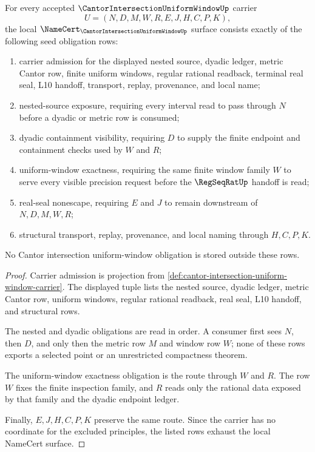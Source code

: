 \begin{theorem}
\label{thm:cantor-intersection-uniform-window-namecert-obligations}
For every accepted $\CantorIntersectionUniformWindowUp$ carrier
$$
U=(N,D,M,W,R,E,J,H,C,P,K),
$$
the local $\NameCert_{\CantorIntersectionUniformWindowUp}$ surface consists exactly of the following seed obligation rows:
\begin{enumerate}
\item carrier admission for the displayed nested source, dyadic ledger, metric Cantor row, finite uniform windows, regular rational readback, terminal real seal, L10 handoff, transport, replay, provenance, and local name;
\item nested-source exposure, requiring every interval read to pass through $N$ before a dyadic or metric row is consumed;
\item dyadic containment visibility, requiring $D$ to supply the finite endpoint and containment checks used by $W$ and $R$;
\item uniform-window exactness, requiring the same finite window family $W$ to serve every visible precision request before the $\RegSeqRatUp$ handoff is read;
\item real-seal nonescape, requiring $E$ and $J$ to remain downstream of $N,D,M,W,R$;
\item structural transport, replay, provenance, and local naming through $H,C,P,K$.
\end{enumerate}
No Cantor intersection uniform-window obligation is stored outside these rows.
\end{theorem}
\begin{proof}
Carrier admission is projection from \autoref{def:cantor-intersection-uniform-window-carrier}. The displayed tuple lists the nested source, dyadic ledger, metric Cantor row, uniform windows, regular rational readback, real seal, L10 handoff, and structural rows.

The nested and dyadic obligations are read in order. A consumer first sees $N$, then $D$, and only then the metric row $M$ and window row $W$; none of these rows exports a selected point or an unrestricted compactness theorem.

The uniform-window exactness obligation is the route through $W$ and $R$. The row $W$ fixes the finite inspection family, and $R$ reads only the rational data exposed by that family and the dyadic endpoint ledger.

Finally, $E,J,H,C,P,K$ preserve the same route. Since the carrier has no coordinate for the excluded principles, the listed rows exhaust the local NameCert surface.
\end{proof}

